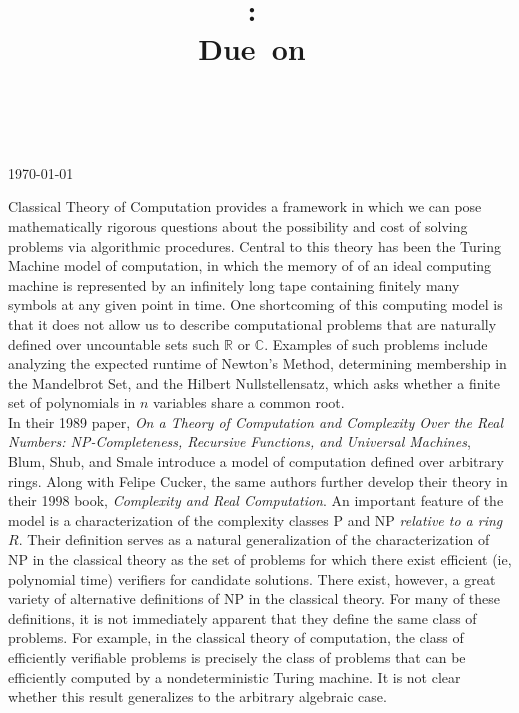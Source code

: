 \documentclass{article}
\title{\vspace{2in}\textmd{\textbf{\hmwkClass:\ \hmwkTitle\ifthenelse{\equal{\hmwkSubTitle}{}}{}{\\\hmwkSubTitle}}}\\\normalsize\vspace{0.1in}\small{Due\ on\ \hmwkDueDate}\\\vspace{0.1in}\large{\textit{\hmwkClassInstructor\ \hmwkClassTime}}\vspace{3in}}
\date{}
\author{\textbf{\hmwkAuthorName}}
\begin{document}
\begin{spacing}{1.1}
  
  \hfill \today

  \vspace{.15in}
  
  \hspace{3pt} Classical Theory of Computation provides a framework in
  which we can pose mathematically rigorous questions about the
  possibility and cost of solving problems via algorithmic procedures.
  Central to this theory has been the Turing Machine model of
  computation, in which the memory of of an ideal computing machine is
  represented by an infinitely long tape containing finitely many
  symbols at any given point in time.  One shortcoming of this
  computing model is that it does not allow us to describe
  computational problems that are naturally defined over uncountable
  sets such $\mathbb{R}$ or $\mathbb{C}$.  Examples of such problems
  include analyzing the expected runtime of Newton's Method,
  determining membership in the Mandelbrot Set, and the Hilbert
  Nullstellensatz, which asks whether a finite set of
  polynomials in $n$ variables share a common root.  \\

  In their 1989 paper, \emph{On a Theory of Computation and Complexity
    Over the Real Numbers: NP-Completeness, Recursive Functions, and
    Universal Machines}, Blum, Shub, and Smale introduce a model of
  computation defined over arbitrary rings.  Along with Felipe Cucker,
  the same authors further develop their theory in their 1998 book,
  \textit{Complexity and Real Computation}.  An important feature of
  the model is a characterization of the complexity classes P and NP
  \emph{relative to a ring $R$}.  Their definition serves as a natural
  generalization of the characterization of NP in the classical theory
  as the set of problems for which there exist efficient (ie,
  polynomial time) verifiers for candidate solutions.  There exist,
  however, a great variety of alternative definitions of NP in the
  classical theory.  For many of these definitions, it is not
  immediately apparent that they define the same class of
  problems. For example, in the classical theory of computation, the
  class of efficiently verifiable problems is precisely the class of
  problems that can be efficiently computed by a nondeterministic
  Turing machine.  It is not clear whether this result generalizes
  to the arbitrary algebraic case. \\


\end{spacing}
\end{document}

